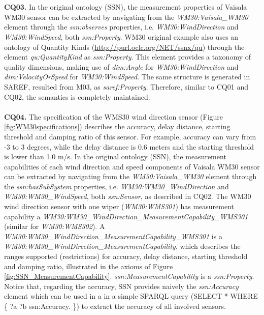 \documentclass{sig-alternate-05-2015}
\begin{document}
\\\\\textbf{CQ03.} In the original ontology (SSN), the measurement properties of Vaisala WM30 sensor can be extracted by navigating from the \textit{WM30:\-Vaisala\-\_WM30} element through the \textit{ssn:\-observes} properties, i.e. \textit{WM30:\-WindDirection} and \textit{WM30:\-WindSpeed}, both \textit{ssn:\-Property}. WM30 original example also uses an ontology of Quantity Kinds (\url{http://purl.oclc.org/NET/ssnx/qu}) through the element \textit{qu:QuantityKind} as \textit{ssn:\-Property}. This element provides a taxonomy of quality dimensions, making use of \textit{dim:Angle} for \textit{WM30:\-WindDirection} and \textit{dim:VelocityOrSpeed} for \textit{WM30:\-WindSpeed}. The same structure is generated in SAREF, resulted from M03, as \textit{saref:\-Property}. Therefore, similar to CQ01 and CQ02, the semantics is completely maintained.
\\\\\textbf{CQ04.} The specification of the WMS30 wind direction sensor (Figure \ref{fig:WM30specifications}) describes the accuracy, delay distance, starting threshold and damping ratio of this sensor. For example, accuracy can vary from -3 to 3 degrees, while the delay distance is 0.6 meters and the starting threshold is lower than 1.0 m/s.  
In the original ontology (SSN), the measurement capabilities of each wind direction and speed components  of Vaisala WM30 sensor can be extracted by navigating from the \textit{WM30:\-Vaisala\-\_WM30} element through the \textit{ssn:\-hasSubSystem} properties, i.e. \textit{WM30:\-WM30\-\_Wind\-Direction} and \textit{WM30:\-WM30\-\_WindSpeed}, both \textit{ssn:\-Sensor}, as described in CQ02. The WM30 wind direction sensor with one wiper (\textit{WM30:\-WMS301}) has measurement capability a  \textit{WM30:\-WM30\-\_Wind\-Direction\-\_MeasurementCapability\-\_WMS301} (similar for \textit{WM30:\-WMS302}). A \textit{WM30:\-WM30\-\_Wind\-Direction\-\_MeasurementCapability\-\_WMS301} is a \textit{WM30:\-WM30\-\_Wind\-Direction\-\_MeasurementCapability}, which describes the ranges supported (restrictions) for accuracy, delay distance, starting threshold and damping ratio, illustrated in the axioms of Figure \ref{fig:SSN_MeasurementCapability}. \textit{ssn:\-MeasurementCapability} is a \textit{ssn:\-Property}.
Notice that, regarding the accuracy, SSN provides naively the \textit{ssn:\-Accuracy} element which can be used in a in a simple SPARQL query (SELECT * WHERE \{ ?a ?b ssn:\-Accuracy. \}) to extract the accuracy of all involved sensors.  
\end{document}
